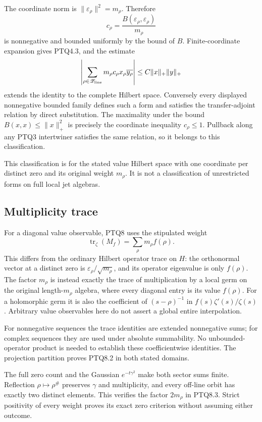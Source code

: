 The coordinate norm is \(\|\varepsilon_\rho\|^2=m_\rho\). Therefore \[
c_\rho=\frac{B(\varepsilon_\rho,\varepsilon_\rho)}{m_\rho}
\] is nonnegative and bounded uniformly by the bound of \(B\).
Finite-coordinate expansion gives PTQ4.3, and the estimate \[
\left|\sum_{\rho\in\mathscr Z_{\rm line}}
m_\rho c_\rho x_\rho\overline{y_\rho}\right|
\le C\|x\|_+\|y\|_+
\] extends the identity to the complete Hilbert space. Conversely every
displayed nonnegative bounded family defines such a form and satisfies
the transfer-adjoint relation by direct substitution. The maximality
under the bound \(B(x,x)\le\|x\|_+^2\) is precisely the coordinate
inequality \(c_\rho\le1\). Pullback along any PTQ3 intertwiner satisfies
the same relation, so it belongs to this classification.

This classification is for the stated value Hilbert space with one
coordinate per distinct zero and its original weight \(m_\rho\). It is
not a classification of unrestricted forms on full local jet algebras.

\subsection{Multiplicity trace}\label{multiplicity-trace}

For a diagonal value observable, PTQ8 uses the stipulated weight \[
\operatorname{tr}_\zeta(M_f)=\sum_\rho m_\rho f(\rho).
\] This differs from the ordinary Hilbert operator trace on \(H\): the
orthonormal vector at a distinct zero is
\(\varepsilon_\rho/\sqrt{m_\rho}\), and its operator eigenvalue is only
\(f(\rho)\). The factor \(m_\rho\) is instead exactly the trace of
multiplication by a local germ on the original length-\(m_\rho\)
algebra, where every diagonal entry is its value \(f(\rho)\). For a
holomorphic germ it is also the coefficient of \((s-\rho)^{-1}\) in
\(f(s)\zeta'(s)/\zeta(s)\). Arbitrary value observables here do not
assert a global entire interpolation.

For nonnegative sequences the trace identities are extended nonnegative
sums; for complex sequences they are used under absolute summability. No
unbounded-operator product is needed to establish these coefficientwise
identities. The projection partition proves PTQ8.2 in both stated
domains.

The full zero count and the Gaussian \(e^{-t\gamma^2}\) make both sector
sums finite. Reflection \(\rho\mapsto\rho^\#\) preserves \(\gamma\) and
multiplicity, and every off-line orbit has exactly two distinct
elements. This verifies the factor \(2m_\rho\) in PTQ8.3. Strict
positivity of every weight proves its exact zero criterion without
assuming either outcome.

